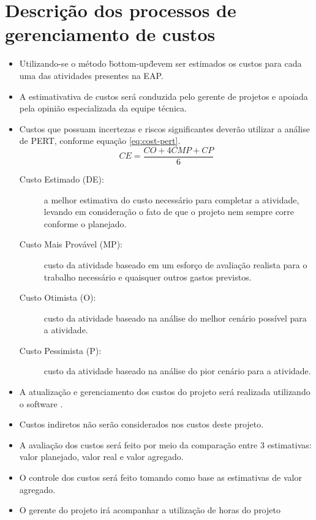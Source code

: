 \section{Descrição dos processos de gerenciamento de custos}


\begin{itemize}
	\item Utilizando-se o método \"bottom-up\" devem ser estimados os custos para cada uma das atividades presentes na EAP.
	\item A estimativativa de custos será conduzida pelo gerente de projetos e apoiada pela opinião especializada da equipe técnica.
	\item Custos que possuam incertezas e riscos significantes deverão utilizar a análise de PERT, conforme equação \ref{eq:cost-pert}.
	      \begin{equation}\label{eq:cost-pert}
		      CE = \frac{CO+4CMP+CP}{6}
	      \end{equation}
	      \begin{description}
		      \item[Custo Estimado (DE):] a melhor estimativa do custo necessário para completar a atividade, levando em consideração o fato de que o projeto nem sempre corre conforme o planejado.
		      \item[Custo Mais Provável (MP):] custo da atividade baseado em um esforço de avaliação realista para o trabalho necessário e quaisquer outros gastos previstos.
		      \item[Custo Otimista (O):] custo da atividade baseado na análise do melhor cenário possível para a atividade.
		      \item[Custo Pessimista (P):] custo da atividade baseado na análise do pior cenário para a atividade.
	      \end{description}
	\item A atualização e gerenciamento dos custos do projeto será realizada utilizando o software \projectManagementSoftwareName{}.
	\item Custos indiretos não serão considerados nos custos deste projeto.
	\item A avaliação dos custos será feito por meio da comparação entre 3 estimativas: valor planejado, valor real e valor agregado.
	\item O controle dos custos será feito tomando como base as estimativas de valor agregado.
	\item O gerente do projeto irá acompanhar a utilização de horas do projeto
\end{itemize}

